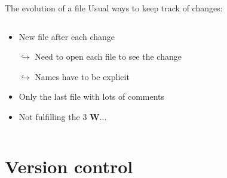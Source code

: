 \documentclass[xcolor=x11names,compress]{beamer}
\renewcommand{\(}{\begin{columns}}
\renewcommand{\)}{\end{columns}}
\newcommand{\<}[1]{\begin{column}{#1}}
\renewcommand{\>}{\end{column}}
\begin{document}
\begin{frame}{The evolution of a file}
Usual ways to keep track of changes:
\pause
\begin{columns}[t]
\begin{column}{0.6\textwidth}
\begin{itemize}[<+->]
        \item New file after each change
        \item[$\hookrightarrow$] Need to open each file to see the change
        \item[$\hookrightarrow$] Names have to be explicit
        \item Only the last file with lots of comments
        \item Not fulfilling the 3 \textcolor{siap}{\textbf{W}}...

    \end{itemize}
 \end{column}
  \begin{column}{0.4\textwidth}
    \begin{center}
    \begin{itemize}

    \end{itemize}
    \end{center}
  \end{column}
\end{columns}
\end{frame}

\section{Version control}
\end{document}
